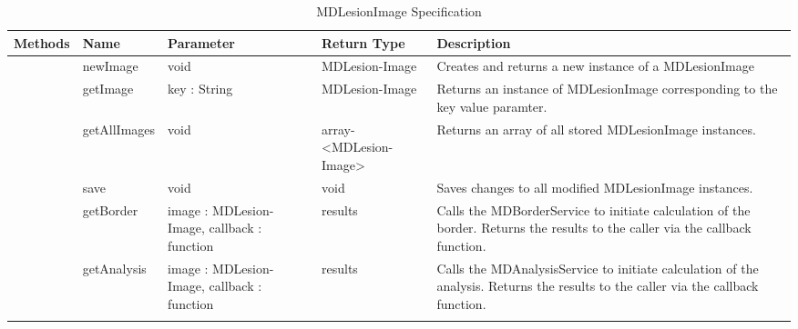 {\begin{longtable}[H]{  | >{\bfseries}p{2cm} | p{2.2cm} | p{1.5cm} | p{1.5cm} | p{4cm} | }
    Methods
    & Name & Parameter & Return Type & Description \\ \hline

        & newImage & void & MDLesion-Image &
            Creates and returns a new instance of a MDLesionImage
            \\ \hline

        & getImage & key : String & MDLesion-Image &
            Returns an instance of MDLesionImage corresponding to the key value paramter.
            \\ \hline

        & getAllImages & void & array-\textless MDLesion-Image\textgreater &
            Returns an array of all stored MDLesionImage instances.
            \\ \hline

        & save & void & void &
            Saves changes to all modified MDLesionImage instances.
            \\ \hline

        & getBorder & image : MDLesion-Image, callback : function & results &
            Calls the MDBorderService to initiate calculation of the border. Returns the results to the caller via the callback function.
            \\ \hline

        & getAnalysis & image : MDLesion-Image, callback : function & results &
            Calls the MDAnalysisService to initiate calculation of the analysis. Returns the results to the caller via the callback function.
            \\ \hline



    \caption{MDLesionImage Specification}
    \label{fig:lesionimage_service}
\end{longtable}
}